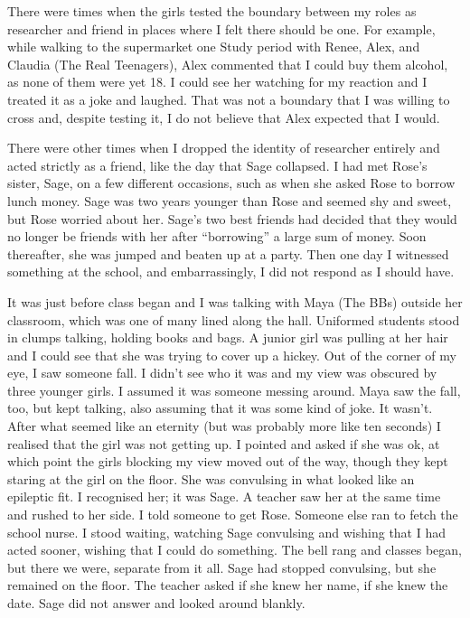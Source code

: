 There were times when the girls tested the boundary between my roles as researcher and friend in places where I felt there should be one.  For example, while walking to the supermarket one Study period with Renee, Alex, and Claudia (The Real Teenagers), Alex commented that I could buy them alcohol, as none of them were yet 18.  I could see her watching for my reaction and I treated it as a joke and laughed.  That was not a boundary that I was willing to cross and, despite testing it, I do not believe that Alex expected that I would.



There were other times when I dropped the identity of researcher entirely and acted strictly as a friend, like the day that Sage collapsed.  I had met Rose's sister, Sage, on a few different occasions, such as when she asked Rose to borrow lunch money.  Sage was two years younger than Rose and seemed shy and sweet, but Rose worried about her.  Sage's two best friends had decided that they would no longer be friends with her after ``borrowing'' a large sum of money. Soon thereafter, she was jumped and beaten up at a party.  Then one day I witnessed something at the school, and embarrassingly, I did not respond as I should have.  

It was just before class began and I was talking with Maya (The BBs) outside her classroom, which was one of many lined along the hall.  Uniformed students stood in clumps talking, holding books and bags.  A junior girl was pulling at her hair and I could see that she was trying to cover up a hickey.  Out of the corner of my eye, I saw someone fall.  I didn't see who it was and my view was obscured by three younger girls.  I assumed it was someone messing around.  Maya saw the fall, too, but kept talking, also assuming that it was some kind of joke.  It wasn't.  After what seemed like an eternity (but was probably more like ten seconds) I realised that the girl was not getting up.  I pointed and asked if she was ok, at which point the girls blocking my view moved out of the way, though they kept staring at the girl on the floor.  She was convulsing in what looked like an epileptic fit.  I recognised her; it was Sage.  A teacher saw her at the same time and rushed to her side.  I told someone to get Rose.  Someone else ran to fetch the school nurse.  I stood waiting, watching Sage convulsing and wishing that I had acted sooner, wishing that I could do something.  The bell rang and classes began, but there we were, separate from it all.  Sage had stopped convulsing, but she remained on the floor.  The teacher asked if she knew her name, if she knew the date.  Sage did not answer and looked around blankly. 

